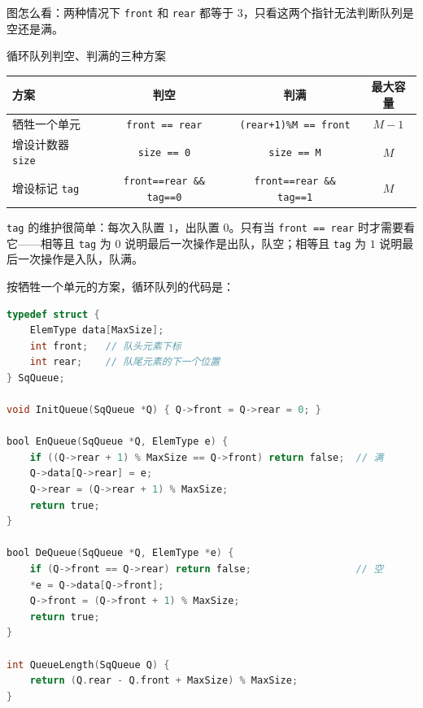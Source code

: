 \begin{center}
\end{center}
{\footnotesize\noindent 图怎么看：两种情况下 \texttt{front} 和 \texttt{rear} 都等于 $3$，只看这两个指针无法判断队列是空还是满。\par}

\begin{tablebox}{循环队列判空、判满的三种方案}
\centering\footnotesize
\setlength{\tabcolsep}{5pt}
\begin{tabular}{@{}lccc@{}}
\toprule
方案 & 判空 & 判满 & 最大容量 \\
\midrule
牺牲一个单元 & \texttt{front == rear} & \texttt{(rear+1)\%M == front} & $M-1$ \\
增设计数器 \texttt{size} & \texttt{size == 0} & \texttt{size == M} & $M$ \\
增设标记 \texttt{tag} & \texttt{front==rear \&\& tag==0} & \texttt{front==rear \&\& tag==1} & $M$ \\
\bottomrule
\end{tabular}
\end{tablebox}

\noindent \texttt{tag} 的维护很简单：每次入队置 $1$，出队置 $0$。只有当 \texttt{front == rear} 时才需要看它——相等且 \texttt{tag} 为 $0$ 说明最后一次操作是出队，队空；相等且 \texttt{tag} 为 $1$ 说明最后一次操作是入队，队满。

按牺牲一个单元的方案，循环队列的代码是：

\begin{lstlisting}[language=C]
typedef struct {
    ElemType data[MaxSize];
    int front;   // 队头元素下标
    int rear;    // 队尾元素的下一个位置
} SqQueue;

void InitQueue(SqQueue *Q) { Q->front = Q->rear = 0; }

bool EnQueue(SqQueue *Q, ElemType e) {
    if ((Q->rear + 1) % MaxSize == Q->front) return false;  // 满
    Q->data[Q->rear] = e;
    Q->rear = (Q->rear + 1) % MaxSize;
    return true;
}

bool DeQueue(SqQueue *Q, ElemType *e) {
    if (Q->front == Q->rear) return false;                  // 空
    *e = Q->data[Q->front];
    Q->front = (Q->front + 1) % MaxSize;
    return true;
}

int QueueLength(SqQueue Q) {
    return (Q.rear - Q.front + MaxSize) % MaxSize;
}
\end{lstlisting}

